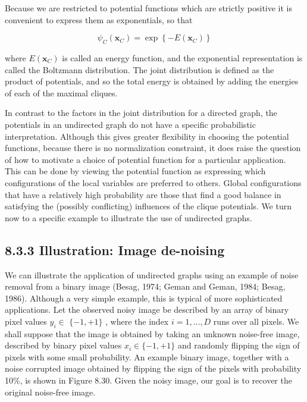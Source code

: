 \documentclass[
  10
]{article}
\begin{document}
Because we are restricted to potential functions which are strictly
positive it is convenient to express them as exponentials, so that

\[
\psi_ {C} (\mathbf {x} _ {C}) = \exp \left\{- E (\mathbf {x} _ {C}) \right\}\tag{8.41}
\]

where \(E ( \mathbf { x } _ { C } )\) is called an energy function, and
the exponential representation is called the Boltzmann distribution. The
joint distribution is defined as the product of potentials, and so the
total energy is obtained by adding the energies of each of the maximal
cliques.

In contrast to the factors in the joint distribution for a directed
graph, the potentials in an undirected graph do not have a specific
probabilistic interpretation. Although this gives greater flexibility in
choosing the potential functions, because there is no normalization
constraint, it does raise the question of how to motivate a choice of
potential function for a particular application. This can be done by
viewing the potential function as expressing which configurations of the
local variables are preferred to others. Global configurations that have
a relatively high probability are those that find a good balance in
satisfying the (possibly conflicting) influences of the clique
potentials. We turn now to a specific example to illustrate the use of
undirected graphs.

\subsection{8.3.3 Illustration: Image
de-noising}\label{illustration-image-de-noising}

We can illustrate the application of undirected graphs using an example
of noise removal from a binary image (Besag, 1974; Geman and Geman,
1984; Besag, 1986). Although a very simple example, this is typical of
more sophisticated applications. Let the observed noisy image be
described by an array of binary pixel values \(y _ { i } \in\)
\(\{ - 1 , + 1 \}\) , where the index \(i = 1 , \ldots , D\) runs over
all pixels. We shall suppose that the image is obtained by taking an
unknown noise-free image, described by binary pixel values
\(x _ { i } \in \{ - 1 , + 1 \}\) and randomly flipping the sign of
pixels with some small probability. An example binary image, together
with a noise corrupted image obtained by flipping the sign of the pixels
with probability 10\%, is shown in Figure 8.30. Given the noisy image,
our goal is to recover the original noise-free image.
\end{document}
